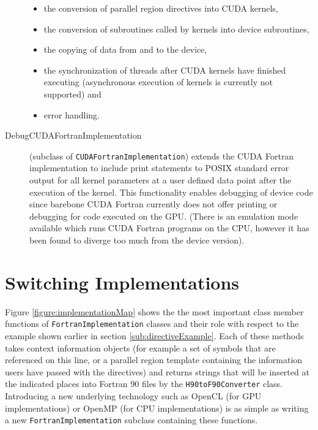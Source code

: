 \begin{description}
\begin{itemize}
  \item the conversion of parallel region directives into CUDA kernels,
  \item the conversion of subroutines called by kernels into device subroutines,
  \item the copying of data from and to the device,
  \item the synchronization of threads after CUDA kernels have finished executing (asynchronous execution of kernels is currently not supported) and
  \item error handling.
 \end{itemize}
 \item[DebugCUDAFortranImplementation] (subclass of \verb|CUDAFortranImplementation|) extends the CUDA Fortran implementation to include print statements to POSIX standard error output for all kernel parameters at a user defined data point after the execution of the kernel. This functionality enables debugging of device code since barebone CUDA Fortran currently does not offer printing or debugging for code executed on the GPU. (There is an emulation mode available which runs CUDA Fortran programs on the CPU, however it has been found to diverge too much from the device version).
\end{description}

\section{Switching Implementations} \label{sub:switchImplementation}

Figure \ref{figure:implementationMap} shows the the most important class member functions of \linebreak
\verb|FortranImplementation| classes and their role with respect to the example shown earlier in section \ref{sub:directiveExample}. Each of these methods takes context information objects (for example a set of symbols that are referenced on this line, or a parallel region template containing the information users have passed with the directives) and returns strings that will be inserted at the indicated places into Fortran 90 files by the \verb|H90toF90Converter| class. Introducing a new underlying technology such as OpenCL (for GPU implementations) or OpenMP (for CPU implementations) is as simple as writing a new \verb|FortranImplementation| subclass containing these functions.

